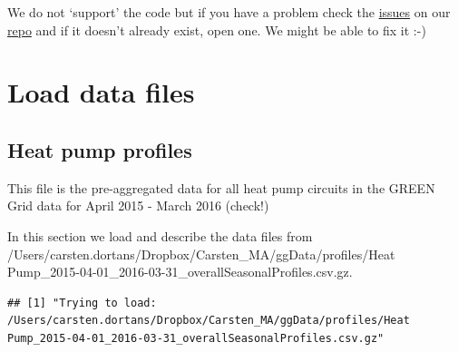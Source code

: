 \documentclass[]{article}
\newenvironment{Shaded}{\begin{snugshade}}{\end{snugshade}}
\newcommand{\KeywordTok}[1]{\textcolor[rgb]{0.13,0.29,0.53}{\textbf{#1}}}
\newcommand{\StringTok}[1]{\textcolor[rgb]{0.31,0.60,0.02}{#1}}
\newcommand{\OperatorTok}[1]{\textcolor[rgb]{0.81,0.36,0.00}{\textbf{#1}}}
\newcommand{\NormalTok}[1]{#1}
\begin{document}
We do not `support' the code but if you have a problem check the
\href{https://git.soton.ac.uk/ba1e12/nzGREENGrid/issues}{issues} on our
\href{https://git.soton.ac.uk/ba1e12/nzGREENGrid}{repo} and if it
doesn't already exist, open one. We might be able to fix it :-)

\section{Load data files}\label{load-data-files}

\subsection{Heat pump profiles}\label{heat-pump-profiles}

This file is the pre-aggregated data for all heat pump circuits in the
GREEN Grid data for April 2015 - March 2016 (check!)

\begin{Shaded}
\end{Shaded}

In this section we load and describe the data files from
/Users/carsten.dortans/Dropbox/Carsten\_MA/ggData/profiles/Heat
Pump\_2015-04-01\_2016-03-31\_overallSeasonalProfiles.csv.gz.

\begin{Shaded}
\end{Shaded}

\begin{verbatim}
## [1] "Trying to load: /Users/carsten.dortans/Dropbox/Carsten_MA/ggData/profiles/Heat Pump_2015-04-01_2016-03-31_overallSeasonalProfiles.csv.gz"
\end{verbatim}

\begin{Shaded}
\end{Shaded}
\end{document}
